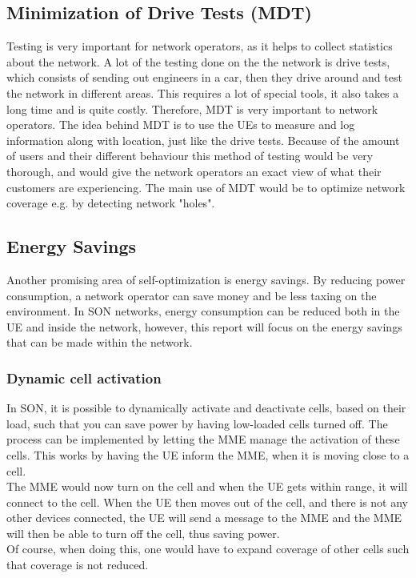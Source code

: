 \documentclass{report}
\begin{document}
\subsection{Minimization of Drive Tests (MDT)}
Testing is very important for network operators, as it helps to collect statistics about the network. A lot of the testing done on the the network is drive tests, which consists of sending out engineers in a car, then they drive around and test the network in different areas. This requires a lot of special tools, it also takes a long time and is quite costly. Therefore, MDT is very important to network operators. The idea behind MDT is to use the UEs to measure and log information along with location, just like the drive tests. Because of the amount of users and their different behaviour this method of testing would be very thorough, and would give the network operators an exact view of what their customers are experiencing. The main use of MDT would be to optimize network coverage e.g. by detecting network "holes". \cite{Sartori2012}

\subsection{Energy Savings}
Another promising area of self-optimization is energy savings. By reducing power consumption, a network operator can save money and be less taxing on the environment. In SON networks, energy consumption can be reduced both in the UE and inside the network, however, this report will focus on the energy savings that can be made within the network.

\subsubsection{Dynamic cell activation}
In SON, it is possible to dynamically activate and deactivate cells, based on their load, such that you can save power by having low-loaded cells turned off. 
The process can be implemented by letting the MME manage the activation of these cells. This works by having the UE inform the MME, when it is moving close to a cell. \\ The MME would now turn on the cell and when the UE gets within range, it will connect to the cell. When the UE then moves out of the cell, and there is not any other devices connected, the UE will send a message to the MME and the MME will then be able to turn off the cell, thus saving power. \\ Of course, when doing this, one would have to expand coverage of other cells such that coverage is not reduced. \cite{Feng2008}
\end{document}
